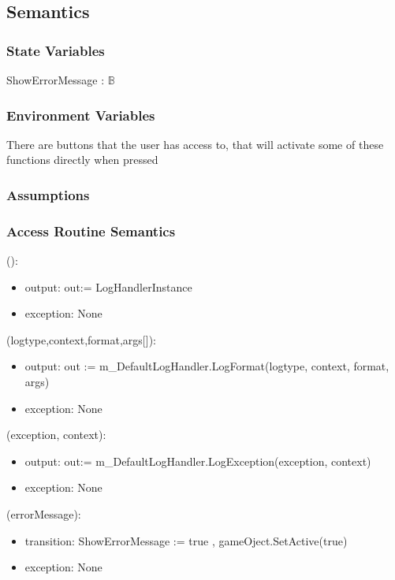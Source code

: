 \documentclass[12pt, titlepage]{article}
\begin{document}
\subsection{Semantics}

\subsubsection{State Variables}

ShowErrorMessage : $\mathds{B}$

\subsubsection{Environment Variables}

There are buttons that the user has access to, that will activate some of these functions directly when pressed

\subsubsection{Assumptions}

\subsubsection{Access Routine Semantics}

():
\begin{itemize}
\item output: out:= LogHandlerInstance
\item exception: None
\end{itemize}

(logtype,context,format,args[]):
\begin{itemize}
\item output: out := m\_DefaultLogHandler.LogFormat(logtype, context, format, args)
\item exception: None
\end{itemize}

(exception, context):
\begin{itemize}
\item output: out:= m\_DefaultLogHandler.LogException(exception, context)
\item exception: None
\end{itemize}

(errorMessage):
\begin{itemize}
\item transition: ShowErrorMessage := true , gameOject.SetActive(true)
\item exception: None
\end{itemize}
\end{document}
